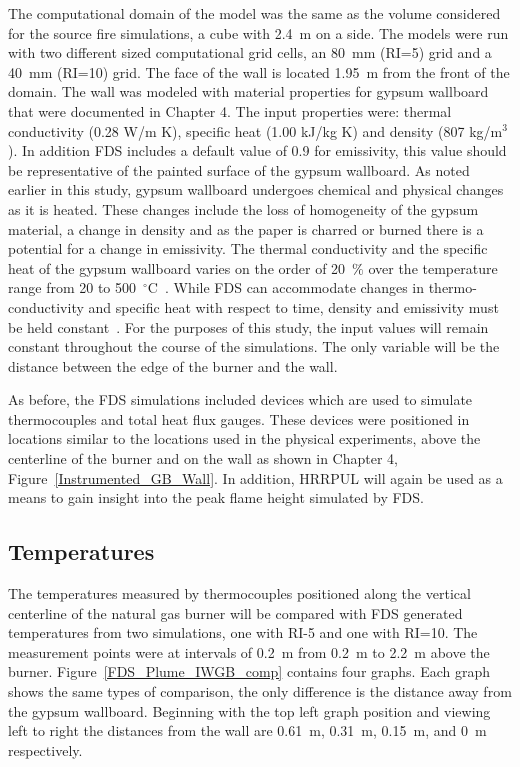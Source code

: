 \documentclass[twoside]{uocthesis}
\begin{document}
{The computational domain of the model was the same as the volume considered for the source fire simulations, a cube with 2.4~m on a side. The models were run with two different sized computational grid cells, an 80~mm (RI=5) grid and a 40~mm (RI=10) grid.  The face of the wall is located 1.95~m from the front of the domain.  
The wall was modeled with material properties for gypsum wallboard that were documented in Chapter 4.  The input properties were: thermal conductivity (0.28 W/m K), specific heat (1.00 kJ/kg K) and density (807 kg/m$^3$).  In addition FDS includes a default value of 0.9 for emissivity, this value should be representative of the painted surface of the gypsum wallboard. As noted earlier in this study, gypsum wallboard undergoes chemical and physical changes as it is heated.  These changes include the loss of homogeneity of the gypsum material, a change in density and as the paper is charred or burned there is a potential for a change in emissivity.  The thermal conductivity and the specific heat of the gypsum wallboard varies on the order of 20~$\%$ over the temperature range from 20 to 500~$^\circ$C~\cite{Gross:1985}.  While FDS can accommodate changes in thermo-conductivity and specific heat with respect to time, density and emissivity must be held constant~\cite{FDS_Users_Guide}.  For the purposes of this study, the input values will remain constant throughout the course of the simulations.  The only variable will be the distance between the edge of the burner and the wall.

As before, the FDS simulations included devices which are used to simulate thermocouples and total heat flux gauges.  These devices were positioned in locations similar to the locations used in the physical experiments, above the centerline of the burner and on the wall as shown in Chapter 4, Figure~\ref{Instrumented_GB_Wall}. In addition, HRRPUL will again be used as a means to gain insight into the peak flame height simulated by FDS.  

\subsection{Temperatures}

 The temperatures measured by thermocouples positioned along the vertical centerline of the natural gas burner will be compared with FDS generated temperatures from two simulations, one with RI-5 and one with RI=10.  The measurement points were at intervals of 0.2~m from 0.2~m to 2.2~m above the burner.  Figure~\ref{FDS_Plume_IWGB_comp} contains four graphs.  Each graph shows the same types of comparison, the only difference is the distance away from the gypsum wallboard.  Beginning with the top left graph position and viewing left to right the distances from the wall are 0.61~m, 0.31~m, 0.15~m, and 0~m respectively.  

}
\end{document}
